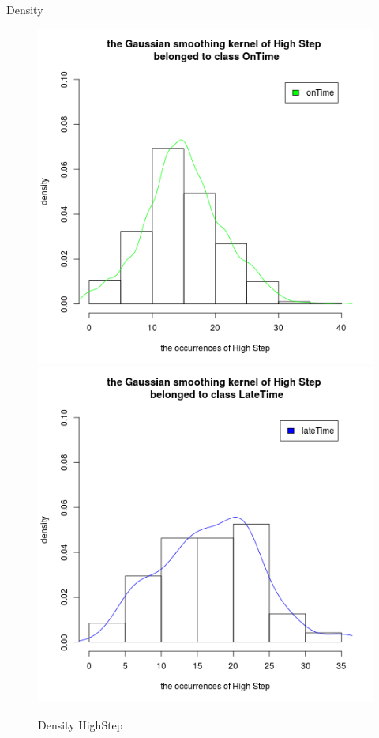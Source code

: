 \documentclass[a4paper, 13pt]{report}
\begin{document}
Density 
\FloatBarrier
\begin{figure}[!htb]
  \includegraphics[width=\linewidth]{DensityHighStep_OnTime}
\endminipage
{}
  \includegraphics[width=\linewidth]{DensityHighStep_LateTime}
\endminipage
\caption*{Density HighStep}
\end{figure}
\end{document}

